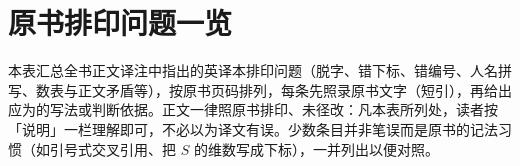 
\chapter{原书排印问题一览}

\noindent 本表汇总全书正文译注中指出的英译本排印问题（脱字、错下标、错编号、人名拼写、数表与正文矛盾等），按原书页码排列，每条先照录原书文字（短引），再给出应为的写法或判断依据。正文一律照原书排印、未径改：凡本表所列处，读者按「说明」一栏理解即可，不必以为译文有误。少数条目并非笔误而是原书的记法习惯（如引号式交叉引用、把 $S$ 的维数写成下标），一并列出以便对照。

